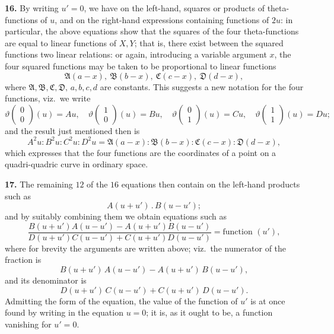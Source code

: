 \documentclass[11pt]{article}
\begin{document}
\medskip

\textbf{16.} By writing $u' = 0$, we have on the left-hand, squares or products of theta-functions of $u$, and on the right-hand expressions containing functions of $2u$: in particular, the above equations show that the squares of the four theta-functions are equal to linear functions of $X,Y$; that is, there exist between the squared functions two linear relations: or again, introducing a variable argument $x$, the four squared functions may be taken to be proportional to linear functions
\[
\mathfrak{A}(a - x),\ \mathfrak{B}(b - x),\ \mathfrak{C}(c - x),\ \mathfrak{D}(d - x),
\]
where $\mathfrak{A},\mathfrak{B},\mathfrak{C},\mathfrak{D},\,a,b,c,d$ are constants. This suggests a new notation for the four functions, viz.\ we write
\[
\vartheta\!\begin{pmatrix} 0 \\ 0 \end{pmatrix}\!(u) = Au,\quad \vartheta\!\begin{pmatrix} 1 \\ 0 \end{pmatrix}\!(u) = Bu,\quad \vartheta\!\begin{pmatrix} 0 \\ 1 \end{pmatrix}\!(u) = Cu,\quad \vartheta\!\begin{pmatrix} 1 \\ 1 \end{pmatrix}\!(u) = Du;
\]
and the result just mentioned then is
\[
A^2 u : B^2 u : C^2 u : D^2 u = \mathfrak{A}(a - x) : \mathfrak{B}(b - x) : \mathfrak{C}(c - x) : \mathfrak{D}(d - x),
\]
which expresses that the four functions are the coordinates of a point on a quadri-quadric curve in ordinary space.

\medskip

\textbf{17.} The remaining $12$ of the $16$ equations then contain on the left-hand products such as
\[
A(u + u')\mathbin{.}B(u - u');
\]
and by suitably combining them we obtain equations such as
\[
\frac{B(u + u')A(u - u') - A(u + u')B(u - u')}{D(u + u')C(u - u') + C(u + u')D(u - u')} = \text{function }(u'),
\]
where for brevity the arguments are written above; viz.\ the numerator of the fraction is
\[
B(u + u')\,A(u - u') - A(u + u')\,B(u - u'),
\]
and its denominator is
\[
D(u + u')\,C(u - u') + C(u + u')\,D(u - u').
\]
Admitting the form of the equation, the value of the function of $u'$ is at once found by writing in the equation $u = 0$; it is, as it ought to be, a function vanishing for $u' = 0$.
\end{document}
